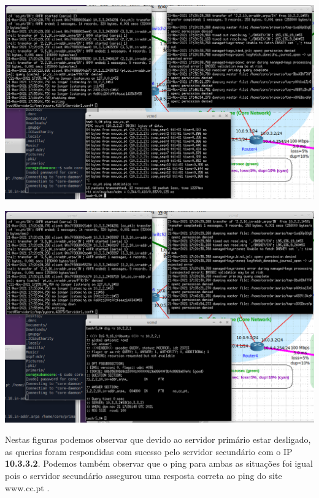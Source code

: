 \documentclass{report}
\begin{document}
        \par
	\vspace{0.45em}
 	\par
	\noindent
        \includegraphics[width=\textwidth]{images/pingum.png}
        \par
	\vspace{0.45em}
 	\par
	\noindent
        \includegraphics[width=\textwidth]{images/reversoum.png}
        \par
	\vspace{0.45em}
 	\par
	Nestas figuras podemos observar que devido ao servidor primário estar desligado, as querias foram respondidas com sucesso pelo servidor secundário com o IP  \textbf{10.3.3.2}. Podemos também observar que o ping para ambas as situações foi igual pois o servidor secundário assegurou uma resposta correta ao ping do site www.cc.pt .
\end{document}
